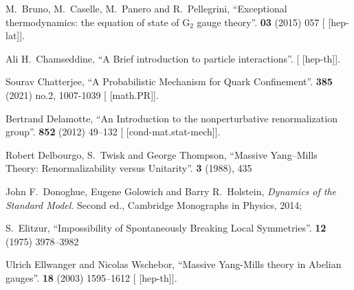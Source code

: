 \begin{thebibliography}{99}
M.~Bruno, M.~Caselle, M.~Panero and R.~Pellegrini,
``Exceptional thermodynamics: the equation of state of G$_{2}$ gauge theory''.
 \textbf{03} (2015) 057
{\tt{}}
[ [hep-lat]].

Ali H.~Chamseddine,
``A Brief introduction to particle interactions''.
[ [hep-th]].

Sourav Chatterjee,
``A Probabilistic Mechanism for Quark Confinement''.
 \textbf{385} (2021) no.2, 1007-1039
{\tt{}}
[ [math.PR]].


Bertrand Delamotte,
``An Introduction to the nonperturbative renormalization group''.
 \textbf{852} (2012) 49--132
{\tt{}}
[ [cond-mat.stat-mech]].

Robert Delbourgo, S.~Twisk and George Thompson,
``Massive Yang--Mills Theory: Renormalizability versus Unitarity''.
 \textbf{3} (1988), 435
{\tt{}}

John F.~Donoghue, Eugene Golowich and Barry R.~Holstein,
\textit{Dynamics of the Standard Model}.
Second ed., Cambridge Monographs in Physics, 2014;
{\tt{}}

S.~Elitzur,
``Impossibility of Spontaneously Breaking Local Symmetries''.
 \textbf{12} (1975) 3978--3982
{\tt{}}

Ulrich Ellwanger and Nicolas Wschebor,
``Massive Yang-Mills theory in Abelian gauges''.
 \textbf{18} (2003) 1595--1612
{\tt{}}
[ [hep-th]].


\end{thebibliography}
